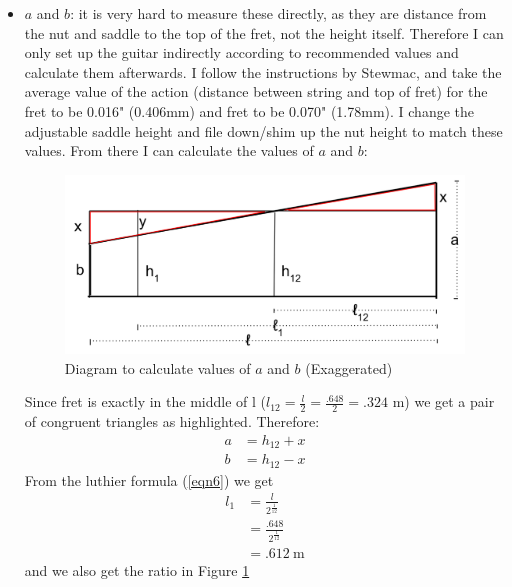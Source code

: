 \documentclass[11pt]{article}
\begin{document}
\begin{flushleft}
\begin{itemize}
                \item $a$ and $b$: it is very hard to measure these directly, as they are distance from the nut and saddle to the top of the fret, not the height itself. Therefore I can only set up the guitar indirectly according to recommended values and calculate them afterwards. I follow the instructions by Stewmac, and take the average value of the action (distance between string and top of fret) for the  fret to be 0.016" (0.406mm) and  fret to be 0.070" (1.78mm). I change the adjustable saddle height and file down/shim up the nut height to match these values. From there I can calculate the values of $a$ and $b$: \\
                \begin{figure}[ht]
                    \includegraphics[width = \textwidth]{fig4.png}
                    \caption{Diagram to calculate values of $a$ and $b$ (Exaggerated)} \label{fig4}
                \end{figure}
                Since fret  is exactly in the middle of l ($l_{12} = \frac{l}{2} = \frac{.648}{2} = .324$ m) we get a pair of congruent triangles as highlighted. Therefore:
                \begin{align*}
                    a &= h_{12} + x \\
                    b &= h_{12} - x
                \end{align*}
                From the luthier formula (\ref{eqn6}) we get
                \begin{align*}
                    l_1 &= \frac{l}{2^{\frac{1}{12}}} \\
                        &= \frac{.648}{2^{\frac{1}{12}}} \\
                        &= \SI{.612}{\meter}
                \end{align*}
                and we also get the ratio in Figure \ref{fig4}
                \begin{align*}

\end{align*}
\end{itemize}
\end{flushleft}
\end{document}
